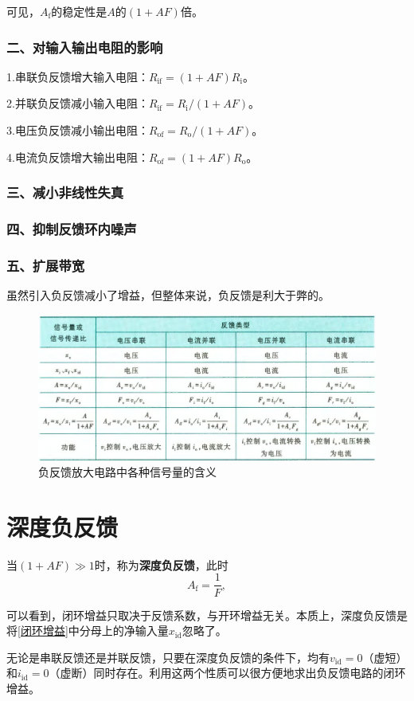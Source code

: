 可见，$A_{\mathrm{f}}$的稳定性是$A$的$(1+AF)$倍。

\subsubsection{二、对输入输出电阻的影响}
1.串联负反馈增大输入电阻：$R_\mathrm{if}=(1+AF)R_\mathrm{i}$。

2.并联负反馈减小输入电阻：$R_\mathrm{if}=R_\mathrm{i}/(1+AF)$。

3.电压负反馈减小输出电阻：$R_\mathrm{of}=R_\mathrm{o}/(1+AF)$。

4.电流负反馈增大输出电阻：$R_\mathrm{of}=(1+AF)R_\mathrm{o}$。

\subsubsection{三、减小非线性失真}

\subsubsection{四、抑制反馈环内噪声}

\subsubsection{五、扩展带宽}

虽然引入负反馈减小了增益，但整体来说，负反馈是利大于弊的。

\begin{figure}[htb]
    \centering
    \includegraphics[width=0.99\linewidth]{pic/负反馈放大电路中各种信号量的含义.png}
    \caption{负反馈放大电路中各种信号量的含义\cite{康华光}\label{负反馈放大电路中各种信号量的含义}}
\end{figure}

\section{深度负反馈}
当$(1+AF)\gg 1$时，称为\textbf{深度负反馈}，此时
\begin{equation}
    A_{\mathrm{f}}=\frac{1}{F},
\end{equation}

可以看到，闭环增益只取决于反馈系数，与开环增益无关。本质上，深度负反馈是将\ref{闭环增益}中分母上的净输入量$x_{\mathrm{id}}$忽略了。

无论是串联反馈还是并联反馈，只要在深度负反馈的条件下，均有$v_{\mathrm{id}}=0$（虚短）和$i_{\mathrm{id}}=0$（虚断）同时存在。利用这两个性质可以很方便地求出负反馈电路的闭环增益。